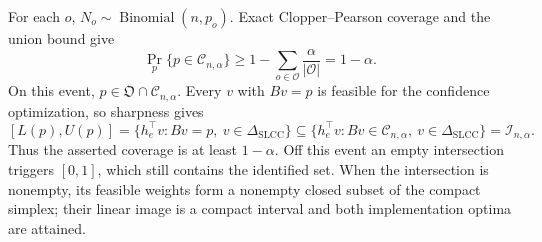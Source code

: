 For each \(o\), \(N_o\sim\operatorname{Binomial}(n,p_o)\).  Exact Clopper--Pearson coverage and the union bound give
\[
\Pr_p\{p\in\mathcal C_{n,\alpha}\}
\geq1-\sum_{o\in\mathcal O}\frac{\alpha}{|\mathcal O|}=1-\alpha.
\]
On this event, \(p\in\mathfrak O\cap\mathcal C_{n,\alpha}\).  Every \(v\) with \(Bv=p\) is feasible for the confidence optimization, so sharpness gives
\[
[L(p),U(p)]
=\{h_e^{\top}v:Bv=p,\ v\in\Delta_{\mathrm{SLCC}}\}
\subseteq
\{h_e^{\top}v:Bv\in\mathcal C_{n,\alpha},\ v\in\Delta_{\mathrm{SLCC}}\}
=\mathcal I_{n,\alpha}.
\]
Thus the asserted coverage is at least \(1-\alpha\).  Off this event an empty intersection triggers \([0,1]\), which still contains the identified set.  When the intersection is nonempty, its feasible weights form a nonempty closed subset of the compact simplex; their linear image is a compact interval and both implementation optima are attained.